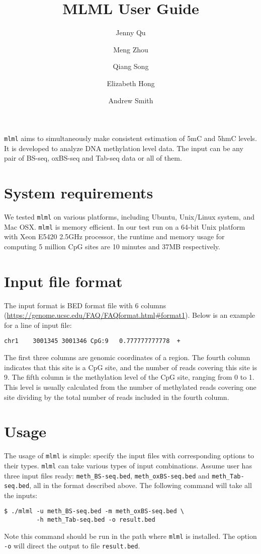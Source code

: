 \documentclass[11pt]{article}
\title{MLML User Guide}
\author{Jenny Qu \and Meng Zhou \and Qiang Song \and Elizabeth Hong \and Andrew Smith}
\newcommand{\prog}[1]{\texttt{#1}}
\newcommand{\fn}[1]{\texttt{#1}}
\newcommand{\op}[1]{\texttt{#1}}
\begin{document}
\maketitle

\prog{mlml} aims to simultaneously make consistent estimation of 5mC and 5hmC levels. It is developed to analyze DNA methylation level data. The input can be any pair of BS-seq, oxBS-seq and Tab-seq data or all of them.

\section{System requirements}
We tested \prog{mlml} on various platforms, including Ubuntu, Unix/Linux system, and Mac OSX. \prog{mlml} is memory efficient. In our test run on a 64-bit Unix platform with Xeon E5420 2.5GHz processor, the runtime and memory usage for computing 5 million CpG sites are 10 minutes and 37MB respectively.

\section{Input file format}
The input format is BED format file with 6 columns (\url{https://genome.ucsc.edu/FAQ/FAQformat.html\#format1}). Below is an example for a line of input file:
\begin{verbatim}
chr1    3001345 3001346 CpG:9   0.777777777778  +
\end{verbatim}

\noindent
The first three columns are genomic coordinates of a region. The fourth column indicates that this site is a CpG site, and the number of reads covering this site is 9. The fifth column is the methylation level of the CpG site, ranging from 0 to 1. This level is usually calculated from the number of methylated reads covering one site dividing by the total number of reads included in the fourth column.

\section{Usage}
The usage of \prog{mlml} is simple: specify the input files with corresponding options to their types. \prog{mlml} can take various types of input combinations. Assume user has three input files ready: \fn{meth\_BS-seq.bed}, \fn{meth\_oxBS-seq.bed} and \fn{meth\_Tab-seq.bed}, all in the format described above. The following command will take all the inputs:
\begin{verbatim}
$ ./mlml -u meth_BS-seq.bed -m meth_oxBS-seq.bed \
         -h meth_Tab-seq.bed -o result.bed
\end{verbatim}
Note this command should be run in the path where \prog{mlml} is installed. The option \op{-o} will direct the output to file \fn{result.bed}.
\end{document}
